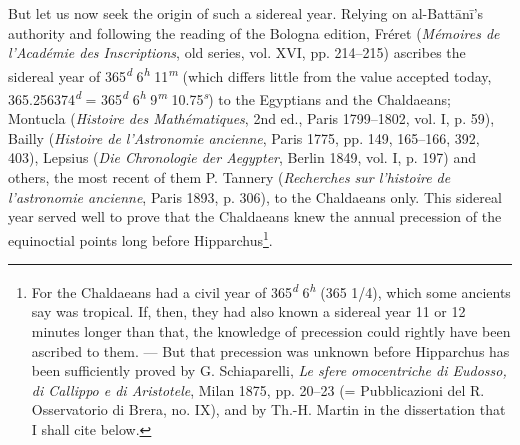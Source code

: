 \documentclass[11pt]{article}
\begin{document}
\par But let us now seek the origin of such a sidereal year. Relying on al-Battānī's authority and following the reading of the Bologna edition, Fréret (\emph{Mémoires de l’Académie des Inscriptions}, old series, vol. XVI, pp. 214–215) ascribes the sidereal year of 365\textsuperscript{\itshape d} 6\textsuperscript{\itshape h} 11\textsuperscript{\itshape m} (which differs little from the value accepted today, 365.256374\textsuperscript{\itshape d} = 365\textsuperscript{\itshape d} 6\textsuperscript{\itshape h} 9\textsuperscript{\itshape m} 10.75\textsuperscript{\itshape s}) to the Egyptians and the Chaldaeans; Montucla (\emph{Histoire des Mathématiques}, 2nd ed., Paris 1799–1802, vol. I, p. 59), Bailly (\emph{Histoire de l’Astronomie ancienne}, Paris 1775, pp. 149, 165–166, 392, 403), Lepsius (\emph{Die Chronologie der Aegypter}, Berlin 1849, vol. I, p. 197) and others, the most recent of them P. Tannery (\emph{Recherches sur l’histoire de l’astronomie ancienne}, Paris 1893, p. 306), to the Chaldaeans only. This sidereal year served well to prove that the Chaldaeans knew the annual precession of the equinoctial points long before Hipparchus\footnote{For the Chaldaeans had a civil year of 365\textsuperscript{\itshape d} 6\textsuperscript{\itshape h} (365 1/4), which some ancients say was tropical. If, then, they had also known a sidereal year 11 or 12 minutes longer than that, the knowledge of precession could rightly have been ascribed to them. — But that precession was unknown before Hipparchus has been sufficiently proved by G. Schiaparelli, \emph{Le sfere omocentriche di Eudosso, di Callippo e di Aristotele}, Milan 1875, pp. 20–23 (= Pubblicazioni del R. Osservatorio di Brera, no. IX), and by Th.-H. Martin in the dissertation that I shall cite below.}.\par
\end{document}
